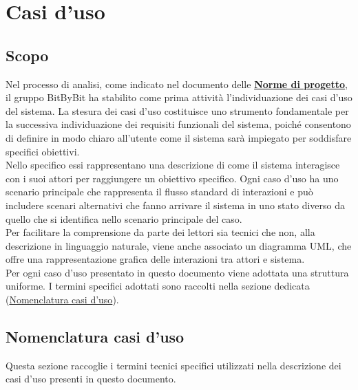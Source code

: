 \documentclass[a4paper,12pt]{article}
\begin{document}

\section{Casi d'uso}

\subsection{Scopo}
Nel processo di analisi, come indicato nel documento delle \href{https://swe-bitbybit.github.io/SWE-docs/docs/documenti_interni/norme_di_progetto.pdf}{\textbf{Norme di progetto}}, il gruppo BitByBit ha stabilito come prima attività l'individuazione dei casi d'uso del sistema. La stesura dei casi d'uso costituisce uno strumento fondamentale per la successiva individuazione dei requisiti funzionali del sistema, poiché consentono di definire in modo chiaro all'utente come il sistema sarà impiegato per soddisfare specifici obiettivi.\\
Nello specifico essi rappresentano una descrizione di come il sistema interagisce con i suoi attori per raggiungere un obiettivo specifico.
Ogni caso d'uso ha uno scenario principale che rappresenta il flusso standard di interazioni e può includere scenari alternativi che fanno arrivare il sistema in uno stato diverso da quello che si identifica nello scenario principale del caso.\\
Per facilitare la comprensione da parte dei lettori sia tecnici che non, alla descrizione in linguaggio naturale, viene anche associato un diagramma UML, che offre una rappresentazione grafica delle interazioni tra attori e sistema.\\
Per ogni caso d'uso presentato in questo documento viene adottata una struttura uniforme. I termini specifici adottati sono raccolti nella sezione dedicata (\hyperref[nomenclatura-casi-duso]{Nomenclatura casi d'uso}).

\subsection{Nomenclatura casi d'uso}
\label{nomenclatura-casi-duso}
Questa sezione raccoglie i termini tecnici specifici utilizzati nella descrizione dei casi d’uso presenti in questo documento.
\end{document}
